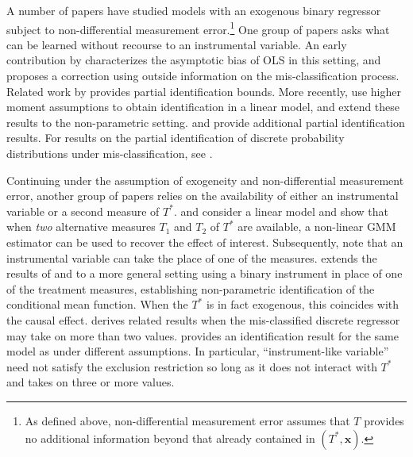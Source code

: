 A number of papers have studied models with an exogenous binary regressor subject to non-differential measurement error.\footnote{As defined above, non-differential measurement error assumes that $T$ provides no additional information beyond that already contained in $(T^*,\mathbf{x})$.}
One group of papers asks what can be learned without recourse to an instrumental variable.
An early contribution by \cite{Aigner} characterizes the asymptotic bias of OLS in this setting, and proposes a correction using outside information on the mis-classification process.
Related work by \cite{Bollinger} provides partial identification bounds.
More recently, \cite{ChenHuLewbel} use higher moment assumptions to obtain identification in a linear model, and \cite{ChenHuLewbel2} extend these results to the non-parametric setting. 
\cite{HasseltBollinger} and \cite{BollingerHasseltWP} provide additional partial identification results.
For results on the partial identification of discrete probability distributions under mis-classification, see \cite{molinari}.

Continuing under the assumption of exogeneity and non-differential measurement error, another group of papers relies on the availability of either an instrumental variable or a second measure of $T^*$.
\cite{BBS} and \cite{KRS} consider a linear model and show that when \emph{two} alternative measures $T_1$ and $T_2$ of $T^*$ are available, a non-linear GMM estimator can be used to recover the effect of interest.
Subsequently, \cite{FL} note that an instrumental variable can take the place of one of the measures.
\cite{Mahajan} extends the results of \cite{BBS} and \cite{KRS} to a more general setting using a binary instrument in place of one of the treatment measures, establishing non-parametric identification of the conditional mean function.
When the $T^*$ is in fact exogenous, this coincides with the causal effect.
\cite{hu2008} derives related results when the mis-classified discrete regressor may take on more than two values.
\cite{Lewbel} provides an identification result for the same model as \cite{Mahajan} under different assumptions.
In particular, ``instrument-like variable'' need not satisfy the exclusion restriction so long as it does not interact with $T^*$ and takes on three or more values.

